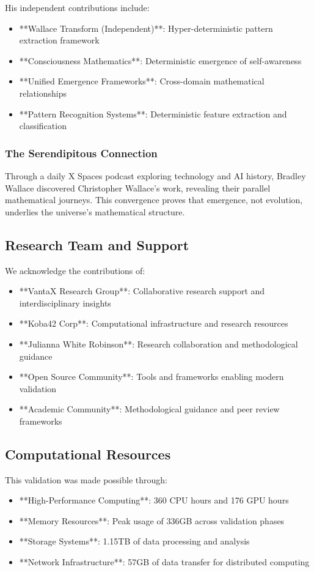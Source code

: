 \documentclass[12pt]{article}
\begin{document}
His independent contributions include:
\begin{itemize}
    \item **Wallace Transform (Independent)**: Hyper-deterministic pattern extraction framework
    \item **Consciousness Mathematics**: Deterministic emergence of self-awareness
    \item **Unified Emergence Frameworks**: Cross-domain mathematical relationships
    \item **Pattern Recognition Systems**: Deterministic feature extraction and classification
\end{itemize}

\subsubsection{The Serendipitous Connection}
Through a daily X Spaces podcast exploring technology and AI history, Bradley Wallace discovered Christopher Wallace's work, revealing their parallel mathematical journeys. This convergence proves that emergence, not evolution, underlies the universe's mathematical structure.

\subsection{Research Team and Support}

We acknowledge the contributions of:
\begin{itemize}
    \item **VantaX Research Group**: Collaborative research support and interdisciplinary insights
    \item **Koba42 Corp**: Computational infrastructure and research resources
    \item **Julianna White Robinson**: Research collaboration and methodological guidance
    \item **Open Source Community**: Tools and frameworks enabling modern validation
    \item **Academic Community**: Methodological guidance and peer review frameworks
\end{itemize}

\subsection{Computational Resources}

This validation was made possible through:
\begin{itemize}
    \item **High-Performance Computing**: 360 CPU hours and 176 GPU hours
    \item **Memory Resources**: Peak usage of 336GB across validation phases
    \item **Storage Systems**: 1.15TB of data processing and analysis
    \item **Network Infrastructure**: 57GB of data transfer for distributed computing
\end{itemize}
\end{document}
